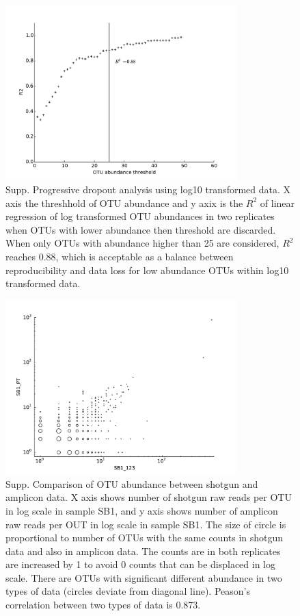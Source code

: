 \documentclass[12pt]{article}
\begin{document}
\begin{figure}[tbph!]
  \centering
  \includegraphics[width=0.8\textwidth]{figs/SB1_techrep_OTUscatR2}
  \caption[Progressive dropout analysis using log10 transformed data]{Supp. Progressive dropout analysis using log10 transformed data. X axis the threshhold of OTU abundance and y axix is the $R^2$ of linear regression of log transformed OTU abundances in two replicates when OTUs with lower abundance then threshold are discarded. When only OTUs with abundance higher than 25 are considered, $R^2$ reaches 0.88,  which is acceptable as a balance between reproducibility and data loss for low abundance OTUs within log10 transformed data.}
  \label{fig:SB1_techrep_OTUscatR2}
\end{figure}

\begin{figure}[tbph!]
  \centering
  \includegraphics[width=0.8\textwidth]{figs/SB1_SGvsPT_OTUscat}
  \caption[Comparison of OTU abundance between shotgun and amplicon data in sample SB1]{Supp. Comparison of OTU abundance between shotgun and amplicon data. X axis shows number of shotgun raw reads per OTU in log scale in sample SB1, and y axis shows number of amplicon raw reads per OUT in log scale in sample SB1. The size of circle is proportional to number of OTUs with the same counts in shotgun data and also in amplicon data. The counts are in both replicates are increased by 1 to avoid 0 counts that can be displaced in log scale. There are OTUs with significant different abundance in two types of data (circles deviate from diagonal line). Peason’s correlation between two types of data is 0.873.}
  \label{fig:SB1_SGvsPT_OTUscat}
\end{figure}
\end{document}
